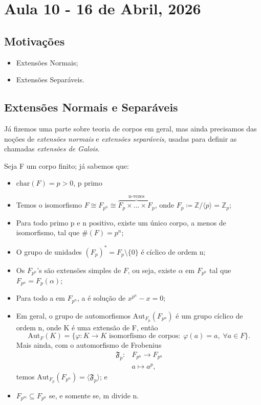 \documentclass[../algebraIII_notes.tex]{subfiles}
\begin{document}
\section{Aula 10 - 16 de Abril, 2026}
\subsection{Motivações}
\begin{itemize}
	\item Extensões Normais;
	\item Extensões Separáveis.
\end{itemize}
\subsection{Extensões Normais e Separáveis}
Já fizemos uma parte sobre teoria de corpos em geral, mas ainda precisamos das noções de \textit{extensões normais} e \textit{extensões separáveis}, usadas para definir as chamadas \textit{extensões de Galois}.

Seja F um corpo finito; já sabemos que:
\begin{itemize}
	\item \(\mathrm{char}(F) = p > 0\), p primo
	\item Temos o isomorfismo \(F \cong F_{p^{n}}\cong \overbrace{F_{p}\times \dotsc \times F_{p}}^{\text{n-vezes}}\), onde \(F_{p}\coloneqq \mathbb{Z}/\langle p \rangle = \mathbb{Z}_{p}\);
	\item Para todo primo p e n positivo, existe um único corpo, a menos de isomorfismo, tal que \(\# (F) = p^{n}\);
	\item O grupo de unidades \((F_{p})^{*} = F_{p}\setminus{\{0\}}\) é cíclico de ordem n;
	\item Os \(F_{p^{n}}\)'s são extensões simples de \(F\), ou seja, existe \(\alpha \) em \(F_{p^{n}}\) tal que \(F_{p^{n}} = F_{p}(\alpha )\);
	\item Para todo a em \(F_{p^{n}}\), a é solução de \(x^{p^{n}} - x = 0\);
	\item Em geral, o grupo de automorfismos \(\mathrm{Aut}_{F_{p}}(F_{p^{n}})\) é um grupo cíclico de ordem n, onde K é uma extensão de F, então
	      \[
		      \mathrm{Aut}_{F}(K) = \{\varphi :K\rightarrow K \text{ isomorfismo de corpos}:\; \varphi (a) = a,\; \forall a\in F\}.
	      \]
	      Mais ainda, com o automorfismo de Frobenius
	      \begin{align*}
		      \mathfrak{F}_{p}: & F_{p^{n}}\rightarrow F_{p^{n}} \\
		                        & a\longmapsto a^{p},
	      \end{align*}
	      temos \(\mathrm{Aut}_{F_{p}}(F_{p^{n}}) = \langle \mathfrak{F}_{p} \rangle\); e
	\item \(F_{p^{m}}\subseteq F_{p^{n}}\) se, e somente se, m divide n.
\end{itemize}
\end{document}
